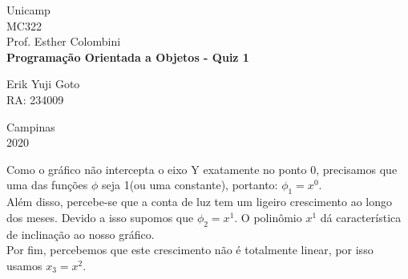 \documentclass[a4paper, 12pt]{article}
\begin{document}
\begin{titlepage} %
	\begin{center} %
		{\large Unicamp}\\[0.2cm] %
		{\large MC322}\\[0.2cm] %
		{\large Prof. Esther Colombini}\\[3.2cm]
		{\bf \huge Programação Orientada a Objetos - Quiz 1}\\[5.1cm] %
	\end{center} %
	{\large Erik Yuji Goto}\\[0.5cm] %
	{\large RA: 234009}\\[10cm]
	\begin{center}
		{\large Campinas}\\[0.2cm]
		{\large 2020}
	\end{center}
\end{titlepage} %

\newpage
Como o gráfico não intercepta o eixo Y exatamente no ponto 0, precisamos que uma das funções $\phi$ seja 1(ou uma constante), portanto: $ \phi_{1} = x^{0} $.\\

Além disso, percebe-se que a conta de luz tem um ligeiro crescimento ao longo dos meses. Devido a isso supomos que $ \phi_{2} = x^{1} $. O polinômio $ x^{1} $ dá característica de inclinação ao nosso gráfico.\\

Por fim, percebemos que este crescimento não é totalmente linear, por isso usamos $ x_{3} = x^{2} $. 
\end{document}
